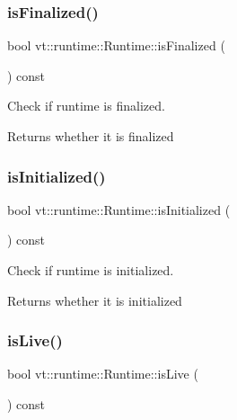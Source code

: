 \subsubsection{\texorpdfstring{is\+Finalized()}{isFinalized()}}
{\footnotesize\ttfamily bool vt\+::runtime\+::\+Runtime\+::is\+Finalized (\begin{DoxyParamCaption}{ }\end{DoxyParamCaption}) const\hspace{0.3cm}{\ttfamily [inline]}}



Check if runtime is finalized. 

\begin{DoxyReturn}{Returns}
whether it is finalized 
\end{DoxyReturn}
\mbox{\label{structvt_1_1runtime_1_1_runtime_a10bd5e7d7dd93c3625a086f5abdf635f}} 
\subsubsection{\texorpdfstring{is\+Initialized()}{isInitialized()}}
{\footnotesize\ttfamily bool vt\+::runtime\+::\+Runtime\+::is\+Initialized (\begin{DoxyParamCaption}{ }\end{DoxyParamCaption}) const\hspace{0.3cm}{\ttfamily [inline]}}



Check if runtime is initialized. 

\begin{DoxyReturn}{Returns}
whether it is initialized 
\end{DoxyReturn}
\mbox{\label{structvt_1_1runtime_1_1_runtime_a811947d9ba7322d0cb10c246200037c8}} 
\subsubsection{\texorpdfstring{is\+Live()}{isLive()}}
{\footnotesize\ttfamily bool vt\+::runtime\+::\+Runtime\+::is\+Live (\begin{DoxyParamCaption}{ }\end{DoxyParamCaption}) const\hspace{0.3cm}{\ttfamily [inline]}}



